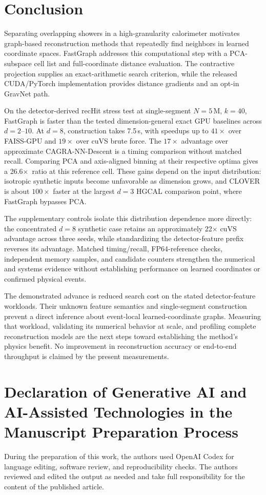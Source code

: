 \documentclass[final,3p,11pt]{elsarticle}
\newcommand{\fgcPCADeight}{7.5\,s}
\newcommand{\fgcVanillaBestPCAfactor}{26.6\ensuremath{\times}}
\begin{document}
\section{Conclusion}

Separating overlapping showers in a high-granularity calorimeter
motivates graph-based reconstruction methods that repeatedly find
neighbors in learned coordinate spaces. FastGraph addresses this
computational step with a PCA-subspace cell list and full-coordinate
distance evaluation. The contractive projection supplies an
exact-arithmetic search criterion, while the released CUDA/PyTorch
implementation provides distance gradients and an opt-in GravNet path.

On the detector-derived recHit stress test at single-segment $N{=}5$\,M,
$k{=}40$, FastGraph is faster than the tested dimension-general exact
GPU baselines across $d{=}2$--$10$. At $d{=}8$, construction takes
\fgcPCADeight, with speedups up to $41\times$ over FAISS-GPU and
$19\times$ over cuVS brute force. The $17\times$ advantage over
approximate CAGRA-NN-Descent is a timing comparison without matched
recall. Comparing PCA and axis-aligned binning at their respective
optima gives a \fgcVanillaBestPCAfactor\ ratio at this reference
cell. These gains depend on the input distribution: isotropic
synthetic inputs become unfavorable as dimension grows, and CLOVER
is about $100\times$ faster at the largest $d{=}3$ HGCAL comparison
point, where FastGraph bypasses PCA.

The supplementary controls isolate this distribution dependence more
directly: the concentrated $d{=}8$ synthetic case retains an approximately
22$\times$ cuVS advantage across three seeds, while standardizing the
detector-feature prefix reverses its advantage. Matched timing/recall,
FP64-reference checks, independent memory samples, and candidate counters
strengthen the numerical and systems evidence without establishing
performance on learned coordinates or confirmed physical events.

The demonstrated advance is reduced search cost on the stated
detector-feature workloads. Their unknown feature semantics and
single-segment construction prevent a direct inference about
event-local learned-coordinate graphs. Measuring that workload,
validating its numerical behavior at scale, and profiling complete
reconstruction models are the next steps toward establishing the
method's physics benefit. No improvement in reconstruction accuracy
or end-to-end throughput is claimed by the present measurements.

\section*{Declaration of Generative AI and AI-Assisted Technologies in the Manuscript Preparation Process}
During the preparation of this work, the authors used OpenAI Codex for
language editing, software review, and reproducibility checks. The authors
reviewed and edited the output as needed and take full responsibility for the
content of the published article.



\end{document}
